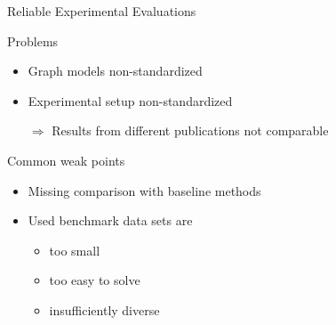 \documentclass[utf8, xcolor=dvipsnames,ngerman]{beamer}
\begin{document}
\begin{frame}{Reliable Experimental Evaluations}

\begin{block}{Problems}
 \begin{itemize}
  \item Graph models non-standardized  
  \item Experimental setup non-standardized 
  \item[$\Rightarrow$] Results from different publications not comparable
 \end{itemize}
\end{block}

\vspace{.8em}
\pause

\begin{block}{Common weak points}
 \begin{itemize}
  \item Missing comparison with baseline methods
  \item Used benchmark data sets are 
  \begin{itemize}
    \item too small
    \item too easy to solve 
    \item insufficiently diverse
  \end{itemize}
 \end{itemize}
\end{block}
 
\end{frame}
\end{document}
